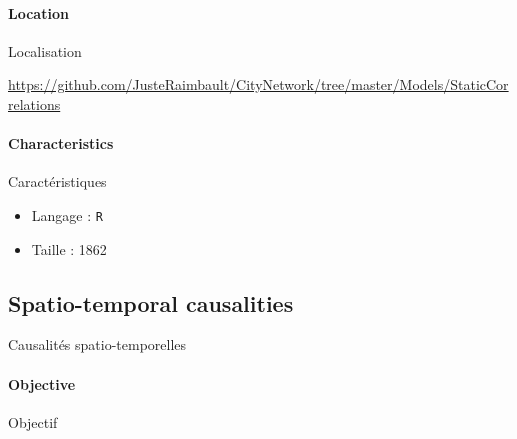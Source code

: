\paragraph{Location}{Localisation}

\url{https://github.com/JusteRaimbault/CityNetwork/tree/master/Models/StaticCorrelations}

\paragraph{Characteristics}{Caractéristiques}

\begin{itemize}
\item Langage : \texttt{R}
\item Taille : 1862
\end{itemize}











\subsection{Spatio-temporal causalities}{Causalités spatio-temporelles}

\paragraph{Objective}{Objectif}

